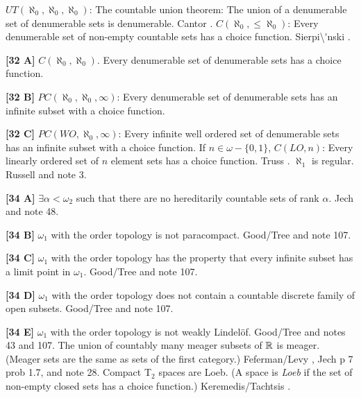 \medskip
{} $UT(\aleph_{0},\aleph_{0},\aleph_{0})$:
The countable union theorem:   The union of a denumerable set
of denumerable sets is denumerable.  \ac{Cantor} \cite{1878}.
\medskip
{} $C(\aleph_0,\le\aleph_0)$: Every denumerable set of
non-empty countable sets  has a choice function.  \ac{Sierpi\'nski}
\cite{1918}.
\smallskip
\item{}{\bf [32 A]}  $C(\aleph_{0},\aleph_{0})$. Every denumerable
set of denumerable sets has a choice function.
\smallskip
\item{}{\bf [32 B]} $PC(\aleph_0,\aleph_0,\infty)$: Every denumerable
set of denumerable sets has an infinite subset with a choice function.
\smallskip
\item{}{\bf [32 C]} $PC(WO,\aleph_0,\infty)$: Every infinite well
ordered set of denumerable sets has an infinite subset with a choice
function.
\medskip
{} If $n\in\omega-\{0,1\}$, $C(LO,n)$:  Every
linearly ordered set of $n$ element sets has  a choice function.
\ac{Truss} \cite{1973a}.
\medskip
{} $\aleph_{1}$ is regular. \ac{Russell}
\cite{1906} and note 3.
\smallskip
\item{}{\bf [34 A]} $\exists\alpha < \omega_2$ such that there are no
hereditarily countable sets of rank $\alpha$.  \ac{Jech} \cite{1982} and
note 48.
\smallskip
\item{}{\bf [34 B]} $\omega_1$ with the order topology is not
paracompact.  \ac{Good/Tree} \cite{1995} and note 107.
\smallskip
\item{}{\bf [34 C]} $\omega_1$ with the order topology has the property
that every infinite subset has a limit point in $\omega_1$.
\ac{Good/Tree} \cite{1995} and note 107.
\smallskip
\item{}{\bf [34 D]} $\omega_1$ with the order topology does not contain
a countable discrete family of open subsets.
\ac{Good/Tree} \cite{1995} and note 107.
\smallskip
\item{}{\bf [34 E]} $\omega_1$ with the order topology is not weakly
Lindel\"of.  \ac{Good/Tree} \cite{1995} and notes 43 and 107.
\medskip
{} The union of countably many meager subsets
of ${\Bbb R}$ is meager. (Meager sets are the same as sets of the
first category.) \ac{Feferman/Levy} \cite{1963}, \ac{Jech} \cite{1973b}
p 7 prob 1.7, and note 28.
\medskip
{}  Compact T$_2$ spaces are Loeb. (A space is
{\it Loeb} if the set of non-empty closed sets has a choice function.)
\ac{Keremedis/Tachtsis} \cite{2000}.
\medskip
